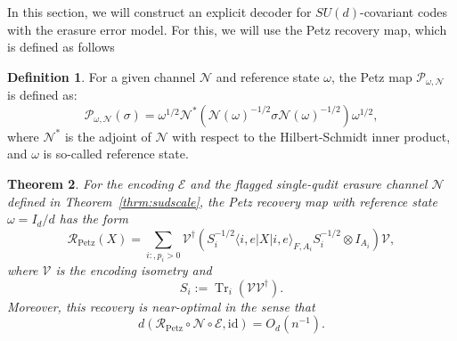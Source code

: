 \documentclass[11pt,letterpaper]{article}
\theoremstyle{plain}
\theoremstyle{plain}
\theoremstyle{plain}
\theoremstyle{plain}
\theoremstyle{plain}
\theoremstyle{plain}
\theoremstyle{plain}
\newtheorem{smtheorem}{Theorem}[section]
\theoremstyle{definition}
\newtheorem{smdefinition}[smtheorem]{Definition}
\theoremstyle{plain}
\begin{document}
In this section, we will construct an explicit decoder for $SU(d)$-covariant codes with the erasure error model.
For this, we will use the Petz recovery map, which is defined as follows
\begin{smdefinition}
    For a given channel $\mathcal{N}$ and reference state $\omega$, the Petz map $\mathcal{P}_{\omega, \mathcal{N}}$ is defined as:
    \[
        \mathcal{P}_{\omega, \mathcal{N}}(\sigma)=\omega^{1 / 2} \mathcal{N}^*\left(\mathcal{N}(\omega)^{-1 / 2} \sigma \mathcal{N}(\omega)^{-1 / 2}\right) \omega^{1 / 2},
    \]
    where $\mathcal{N}^*$ is the adjoint of $\mathcal{N}$ with respect to the Hilbert-Schmidt inner product, and $\omega$ is so-called reference state.
\end{smdefinition}

\begin{smtheorem}\label{thm:petz_decoder_explicit}
For the encoding $\mathcal E$ and the flagged single-qudit erasure channel $\mathcal N$ defined in Theorem~\ref{thrm:sudscale}, 
the Petz recovery map with reference state $\omega=I_d/d$ has the form
$$
\mathcal R_{\mathrm{Petz}}(X)
=
\sum_{i:,p_i>0}
\mathcal{V}^\dagger
\left(
S_i^{-1/2}
\langle i,e|X|i,e\rangle_{F,A_i}
S_i^{-1/2}
\otimes I_{A_i}
\right)
\mathcal{V},
$$
where $\mathcal{V}$ is the encoding isometry and
$$
S_i
:=
\operatorname{Tr}_i\left(\mathcal{V}\mathcal{V}^\dagger\right).
$$
Moreover, this recovery is near-optimal in the sense that
$$
    d\left(
    \mathcal R_{\mathrm{Petz}}
    \circ
    \mathcal N
    \circ
    \mathcal E,
    \mathrm{id}
    \right)
    =
    O_{d}(n^{-1}) .
$$
\end{smtheorem}
\end{document}
